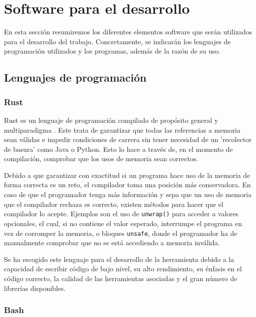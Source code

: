 \section{Software para el desarrollo}

En esta sección resumiremos los diferentes elementos software que serán utilizados para el desarrollo del trabajo. Concretamente, se indicarán los lenguajes de programación utilizados y los programas, además de la razón de su uso.

\subsection{Lenguajes de programación}

\subsubsection{Rust}

Rust es un lenguaje de programación compilado de propósito general y multiparadigma \cite{blandy2017programming} \cite{klabnik2018rust}. Este trata de garantizar que todas las referencias a memoria sean válidas e impedir condiciones de carrera sin tener necesidad de un 'recolector de basura' como Java o Python. Esto lo hace a través de, en el momento de compilación, comprobar que los usos de memoria sean correctos. 

Debido a que garantizar con exactitud si un programa hace uso de la memoria de forma correcta es un reto, el compilador toma una posición más conservadora. En caso de que el programador tenga más información y sepa que un uso de memoria que el compilador rechaza es correcto, existen métodos para hacer que el compilador lo acepte. Ejemplos son el uso de \texttt{unwrap()} para acceder a valores opcionales, el cual, si no contiene el valor esperado, interrumpe el programa en vez de corromper la memoria, o bloques \texttt{unsafe}, donde el programador ha de manualmente comprobar que no se está accediendo a memoria inválida.

Se ha escogido este lenguaje para el desarrollo de la herramienta debido a la capacidad de escribir código de bajo nivel, su alto rendimiento, su énfasis en el código correcto, la calidad de las herramientas asociadas y el gran número de librerías disponibles. 

\subsubsection{Bash}

